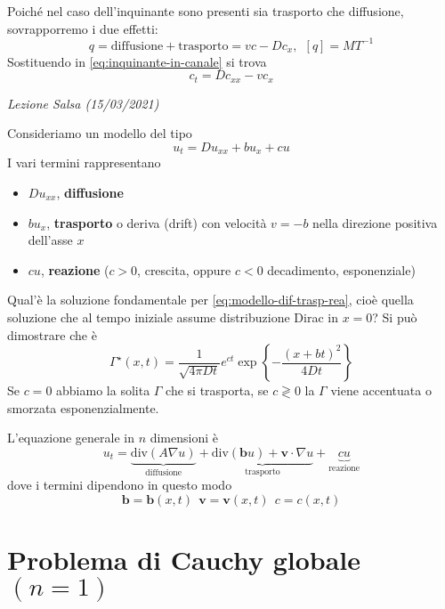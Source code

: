 \documentclass[10pt,a4paper,twoside,openright]{book}
\newcounter{conteggioS}
\newcommand{\LezioneS}[1]{
	\stepcounter{conteggioS}
	\textit{Lezione Salsa \arabic{conteggioS} (#1)}
	}
\begin{document}
Poiché nel caso dell'inquinante sono presenti sia trasporto che diffusione, sovrapporremo i due effetti:
\begin{equation*}
q=\text{diffusione} +\text{trasporto} =vc-Dc_{x},\ \ [ q] =MT^{-1}
\end{equation*}
Sostituendo in \eqref{eq:inquinante-in-canale} si trova
\begin{equation*}
\boxed{c_{t} =Dc_{xx} -vc_{x}}
\end{equation*}
\LezioneS{15/03/2021}

Consideriamo un modello del tipo
\begin{equation}
u_{t} =Du_{xx} +bu_{x} +cu
\label{eq:modello-dif-trasp-rea}
\end{equation}
I vari termini rappresentano
\begin{itemize}
\item $Du_{xx}$, \textbf{diffusione}
\item $bu_{x}$, \textbf{trasporto} o deriva (drift) con velocità $v=-b$ nella direzione positiva dell'asse $x$
\item $cu$, \textbf{reazione} ($c >0$, crescita, oppure $c< 0$ decadimento, esponenziale)
\end{itemize}

Qual'è la soluzione fondamentale per \eqref{eq:modello-dif-trasp-rea}, cioè quella soluzione che al tempo iniziale assume distribuzione Dirac in $x=0$? Si può dimostrare che è
\begin{equation}
\boxed{\Gamma ^{\star }(x,t) =\frac{1}{\sqrt{4\pi Dt}} e^{ct}\exp\left\{-\frac{(x+bt)^{2}}{4Dt}\right\}}
\end{equation}
Se $c=0$ abbiamo la solita $\Gamma $ che si trasporta, se $c\gtrless 0$ la $\Gamma $ viene accentuata o smorzata esponenzialmente.

L'equazione generale in $n$ dimensioni è
\begin{equation*}
u_{t} = \underbrace{\mathrm{div}(A \nabla u)}_{\text{diffusione}} + \underbrace{\mathrm{div}(\mathbf{b} u) +\mathbf{v} \cdot\nabla u}_{\text{trasporto}} + \underbrace{cu}_{\text{reazione}}
\end{equation*}
dove i termini dipendono in questo modo
\begin{equation*}
\mathbf{b} =\mathbf{b}(x,t) \ \ \mathbf{v} =\mathbf{v}(x,t) \ \ c=c(x,t)
\end{equation*}
\section{Problema di Cauchy globale \texorpdfstring{$(n=1)$}{n=1}}
\end{document}
